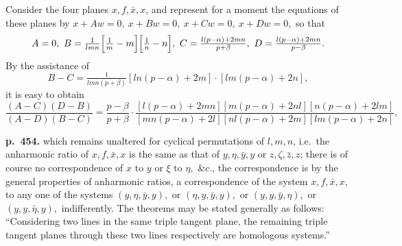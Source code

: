 \documentclass[11pt]{article}
\begin{document}
Consider the four planes $x, f, \bar{x}, x$, and represent for a moment the equations of these planes by $x + Aw = 0,\ x + Bw = 0,\ x + Cw = 0,\ x + Dw = 0,$ so that
\[ A = 0,\ B = \tfrac{1}{lmn}\Bigl[\tfrac{1}{m} - m\Bigr]\Bigl[\tfrac{1}{n} - n\Bigr],\ C = \tfrac{l(p-\alpha) + 2mn}{p + \beta},\ D = \tfrac{l(p-\alpha) + 2mn}{p - \beta}. \]
By the assistance of
\[ B - C = \tfrac{1}{lmn(p+\beta)}[ln(p-\alpha) + 2m]\cdot[lm(p-\alpha) + 2n], \]
it is easy to obtain
\[ \frac{(A - C)(D - B)}{(A - D)(B - C)} = \frac{p - \beta}{p + \beta}\cdot\frac{[l(p-\alpha)+2mn][m(p-\alpha)+2nl][n(p-\alpha)+2lm]}{[mn(p-\alpha)+2l][nl(p-\alpha)+2m][lm(p-\alpha)+2n]}, \]

\bigskip
\noindent\textbf{p.~454.} which remains unaltered for cyclical permutations of $l, m, n$, i.e.\ the anharmonic ratio of $x, f, \bar{x}, x$ is the same as that of $y, \eta, \bar{y}, y$ or $z, \zeta, \bar{z}, z$; there is of course no correspondence of $x$ to $y$ or $\xi$ to $\eta,$ \&c., the correspondence is by the general properties of anharmonic ratios, a correspondence of the system $x, f, \bar{x}, x,$ to any one of the systems $(y, \eta, \bar{y}, y),$ or $(\eta, y, \bar{y}, y),$ or $(y, y, \bar{y}, \eta),$ or $(y, y, \bar{\eta}, y),$ indifferently. The theorems may be stated generally as follows: ``Considering two lines in the same triple tangent plane, the remaining triple tangent planes through these two lines respectively are homologous systems.''
\end{document}
